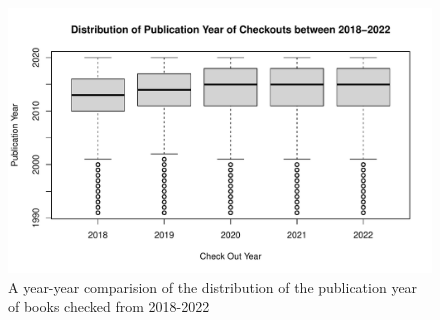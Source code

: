 \documentclass[10pt]{article}\usepackage[]{graphicx}\usepackage[]{xcolor}
\makeatletter
\def\maxwidth{ %
  \ifdim\Gin@nat@width>\linewidth
    \linewidth
  \else
    \Gin@nat@width
  \fi
}
\newenvironment{knitrout}{}{} %
\makeatother
\begin{document}
\begin{figure}[H]
\begin{center}
\begin{knitrout}
\color{fgcolor}
\includegraphics[width=\maxwidth]{figure/plot6-1} 
\end{knitrout}
\end{center}
\caption{A year-year comparision of the distribution of the publication year of books checked from 2018-2022}\label{fig:6}
\end{figure}
\end{document}
